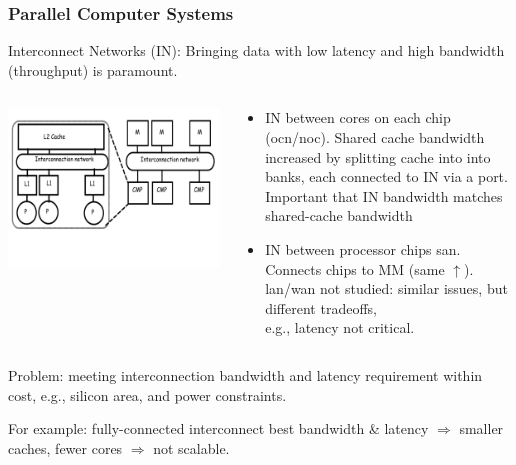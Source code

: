 \documentclass{beamer}
\renewcommand{\emph}[1]{\textcolor{structure}{#1}}
\newcommand{\emp}[1]{\textcolor{DikuRed}{ #1}}
\begin{document}
\begin{frame}[fragile,t]
\frametitle{Parallel Computer Systems}

\emp{Interconnect Networks (IN)}: 
Bringing data with low latency and high bandwidth (throughput) is paramount.


\begin{columns}
\includegraphics[width=44ex]{Figures/FigsInterconnect/ParSys}\pause
{}
\vspace{-6ex}
\begin{scriptsize}
\begin{itemize}
    \item \emp{IN between cores on each chip ({\sc ocn}/{\sc noc})}. 
            Shared cache bandwidth increased by splitting  
                    cache into into banks, 
                each connected to IN via a port.
            \emph{Important that IN bandwidth matches shared-cache bandwidth}
    \item \emp{IN between processor chips {\sc san}.}
            Connects chips to MM (same $\uparrow$).
            {\sc lan}/{\sc wan} not studied: similar issues,
            but different tradeoffs,\\e.g., latency not critical.
\end  {itemize}
\end{scriptsize}
\end{columns}
\vspace{-4ex}

\alert{Problem}: meeting interconnection bandwidth and latency requirement
within cost, e.g., silicon area, and power constraints.
\medskip\pause

For example: fully-connected interconnect best bandwidth \& latency
$\Rightarrow$ smaller caches, fewer cores $\Rightarrow$ not scalable.

\end{frame}
\end{document}
